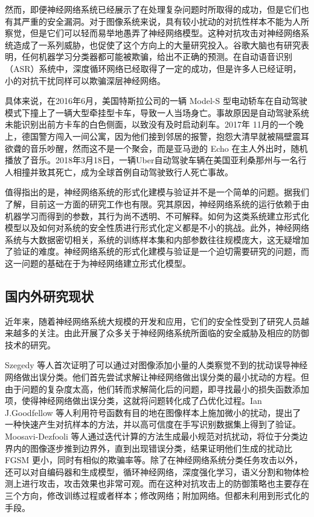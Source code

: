 然而，即便神经网络系统已经展示了在处理复杂问题时所取得的成功，但是它们也有其严重的安全漏洞。对于图像系统来说，具有较小扰动的对抗性样本不能为人所察觉，但是它们可以轻而易举地愚弄了神经网络模型。这种对抗攻击对神经网络系统造成了一系列威胁，也促使了这个方向上的大量研究投入。谷歌大脑也有研究表明，任何机器学习分类器都可能被欺骗，给出不正确的预测。在自动语音识别（ASR）系统中，深度循环网络已经取得了一定的成功，但是许多人已经证明，小的对抗干扰同样可以欺骗深层神经网络。

具体来说，在2016年6月，美国特斯拉公司的一辆 Model-S 型电动轿车在自动驾驶模式下撞上了一辆大型牵挂型卡车，导致一人当场身亡。事故原因是自动驾驶系统未能识别出前方卡车的白色侧面，以致没有及时启动刹车。2017年 11月的一个晚上，德国警方闯入一间公寓，因为他们接到邻居的报警，抱怨大清早就被隔壁震耳欲聋的音乐吵醒，然而这不是一个聚会，而是亚马逊的 Echo 在主人外出时，随机播放了音乐。2018年3月18日，一辆Uber自动驾驶车辆在美国亚利桑那州与一名行人相撞并致其死亡，成为全球首例自动驾驶致行人死亡事故。

值得指出的是，神经网络系统的形式化建模与验证并不是一个简单的问题。据我们了解，目前这一方面的研究工作也有限。究其原因，神经网络系统的运行依赖于由机器学习而得到的参数，其行为尚不透明、不可解释。如何为这类系统建立形式化模型以及如何对系统的安全性质进行形式化定义都是不小的挑战。此外，神经网络系统与大数据密切相关，系统的训练样本集和内部参数往往规模庞大，这无疑增加了验证的难度。神经网络系统的形式化建模与验证是一个迫切需要研究的问题，而这一问题的基础在于为神经网络建立形式化模型。

\subsection{国内外研究现状}

近年来，随着神经网络系统大规模的开发和应用，它们的安全性受到了研究人员越来越多的关注。由此开展了众多关于神经网络系统所面临的安全威胁及相应的防御技术的研究。

Szegedy 等人首次证明了可以通过对图像添加小量的人类察觉不到的扰动误导神经网络做出误分类。他们首先尝试求解让神经网络做出误分类的最小扰动的方程。但由于问题的复杂度太高，他们转而求解简化后的问题，即寻找最小的损失函数添加项，使得神经网络做出误分类，这就将问题转化成了凸优化过程。Ian J.Goodfellow 等人利用符号函数有目的地在图像样本上施加微小的扰动，提出了一种快速产生对抗样本的方法，并以高可信度在手写识别数据集上得到了验证。Moosavi-Dezfooli 等人通过迭代计算的方法生成最小规范对抗扰动，将位于分类边界内的图像逐步推到边界外，直到出现错误分类，结果证明他们生成的扰动比 FGSM 更小，同时有相似的欺骗率等。除了在神经网络系统分类任务攻击以外，还可以对自编码器和生成模型，循环神经网络，深度强化学习，语义分割和物体检测上进行攻击，攻击效果也非常可观。而在这种对抗攻击上的防御策略也主要存在三个方向，修改训练过程或者样本；修改网络；附加网络。但都未利用到形式化的手段。

